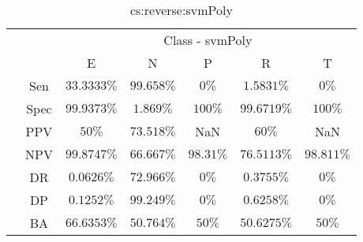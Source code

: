 \begin{table}[!ht]
	\centering
	\begin{tabular}{|c|c|c|c|c|c|c|}
		\cline{3-7}
		\multicolumn{2}{c|}{} & \multicolumn{5}{c|}{Class - svmPoly} \\ \cline{3-7}
		\multicolumn{2}{c|}{} & E & N & P & R & T \\ \hline
		\multirow{7}{*}{\rotatebox{90}{Statistics}} & Sen & $33.3333\%$ & $99.658\%$ & $0\%$ & $1.5831\%$ & $0\%$ \\ \cline{2-7}
		 & Spec & $99.9373\%$ & $1.869\%$ & $100\%$ & $99.6719\%$ & $100\%$ \\ \cline{2-7}
		 & PPV & $50\%$ & $73.518\%$ & NaN & $60\%$ & NaN \\ \cline{2-7}
		 & NPV & $99.8747\%$ & $66.667\%$ & $98.31\%$ & $76.5113\%$ & $98.811\%$ \\ \cline{2-7}
		 & DR & $0.0626\%$ & $72.966\%$ & $0\%$ & $0.3755\%$ & $0\%$ \\ \cline{2-7}
		 & DP & $0.1252\%$ & $99.249\%$ & $0\%$ & $0.6258\%$ & $0\%$ \\ \cline{2-7}
		 & BA & $66.6353\%$ & $50.764\%$ & $50\%$ & $50.6275\%$ & $50\%$ \\ \hline
	\end{tabular}
	\caption{cs:reverse:svmPoly}
	\label{tab:cs:reverse:svmPoly}
\end{table}
